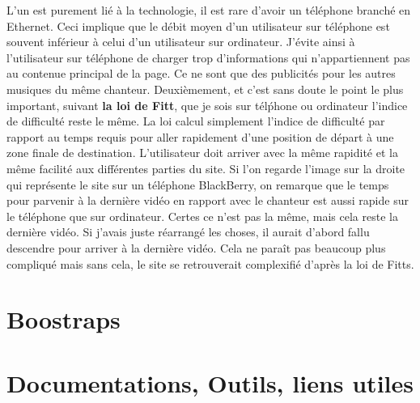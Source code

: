 \documentclass{article}
\begin{document}
{L'un est purement li\'e \`a la technologie, il est rare d'avoir un t\'el\'ephone branch\'e en Ethernet. Ceci implique que le d\'ebit moyen d'un utilisateur sur t\'el\'ephone est souvent inf\'erieur \`a celui d'un utilisateur sur ordinateur. J'\'evite ainsi \`a l'utilisateur sur t\'el\'ephone de charger trop d'informations qui n'appartiennent pas au contenue principal de la page. Ce ne sont que des publicit\'es pour les autres musiques du m\^eme chanteur. Deuxi\`emement, et c'est sans doute le point le plus important, suivant \textbf{la loi de Fitt}, que je sois sur t\'el\'phone ou ordinateur l'indice de difficult\'e reste le m\^eme. La loi calcul simplement l'indice de difficult\'e par rapport au temps requis pour aller rapidement d'une position de d\'epart \`a une zone finale de destination. L'utilisateur doit arriver avec la m\^eme rapidit\'e et la m\^eme facilit\'e aux diff\'erentes parties du site. Si l'on regarde l'image sur la droite qui repr\'esente le site sur un t\'el\'ephone BlackBerry, on remarque que le temps pour parvenir \`a la derni\`ere vid\'eo en rapport avec le chanteur est aussi rapide sur le t\'el\'ephone que sur ordinateur. Certes ce n'est pas la m\^eme, mais cela reste la derni\`ere vid\'eo. Si j'avais juste r\'earrang\'e les choses, il aurait d'abord fallu descendre pour arriver \`a la derni\`ere vid\'eo. Cela ne para\^it pas beaucoup plus compliqu\'e mais sans cela, le site se retrouverait complexifi\'e d'apr\`es la loi de Fitts.


\par

\section{Boostraps}


\section{Documentations, Outils, liens utiles} 

}
\end{document}
